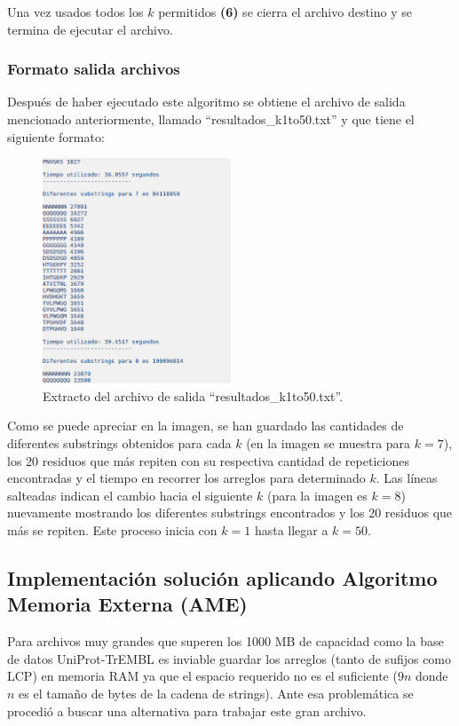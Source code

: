 Una vez usados todos los $k$ permitidos \textbf{(6)} se cierra el archivo destino y se termina de ejecutar el archivo.

\subsubsection{Formato salida archivos}

Después de haber ejecutado este algoritmo se obtiene el archivo de salida mencionado anteriormente, llamado ``resultados\_k1to50.txt'' y que tiene el siguiente formato:

\begin{figure}[h]
    \centering
    \includegraphics[width=0.5\textwidth]{./images/formatosalidaswissprot.png}
    \caption{Extracto del archivo de salida ``resultados\_k1to50.txt''.}
\end{figure}

Como se puede apreciar en la imagen, se han guardado las cantidades de diferentes substrings obtenidos para cada $k$ (en la imagen se muestra para $k = 7$), los 20 residuos que más repiten con su respectiva cantidad de repeticiones encontradas y el tiempo en recorrer los arreglos para determinado $k$. Las líneas salteadas indican el cambio hacia el siguiente $k$ (para la imagen es $k=8$) nuevamente mostrando los diferentes substrings encontrados y los 20 residuos que más se repiten. Este proceso inicia con $k=1$ hasta llegar a $k=50$.

\subsection{Implementación solución aplicando Algoritmo Memoria Externa (AME)}

Para archivos muy grandes que superen los 1000 MB de capacidad como la base de datos UniProt-TrEMBL es inviable guardar los arreglos (tanto de sufijos como LCP) en memoria RAM ya que el espacio requerido no es el suficiente ($9n$ donde $n$ es el tamaño de bytes de la cadena de strings). Ante esa problemática se procedió a buscar una alternativa para trabajar este gran archivo.


